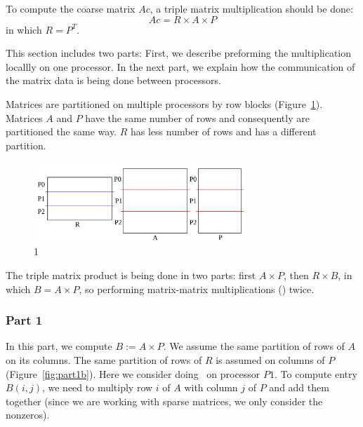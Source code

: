 To compute the coarse matrix $Ac$, a triple matrix multiplication should be done:
\begin{equation}
 Ac = R \times A \times P
\end{equation}
in which $R = P^T$.

This section includes two parts: First, we describe preforming the multiplication locallly on one processor. In the next part, we explain how the communication of the matrix data is being done between processors.


Matrices are partitioned on multiple processors by row blocks (Figure~\ref{fig:partition}). Matrices $A$ and $P$ have the same number of rows and consequently are partitioned the same way. $R$ has less number of rows and has a different partition.

\begin{figure}[tbh]
 \centering
 \includegraphics[width=8cm,height=3cm]{./figures/partition.pdf}
 \caption{1}
 \label{fig:partition}
\end{figure}

The triple matrix product is being done in two parts: first $A \times P$, then $R \times B$, in which $B = A \times P$, so performing matrix-matrix multiplications (\mm) twice.

\subsubsection{Part 1}

In this part, we compute $B := A \times P$. We assume the same partition of rows of $A$ on its columns. The same partition of rows of $R$ is assumed on columns of $P$ (Figure~\ref{fig:part1b}).
Here we consider doing \mm ~on processor $P1$. To compute entry $B(i, j)$, we need to multiply row $i$ of $A$ with column $j$ of $P$ and add them together (since we are working with sparse matrices, we only consider the nonzeros).


